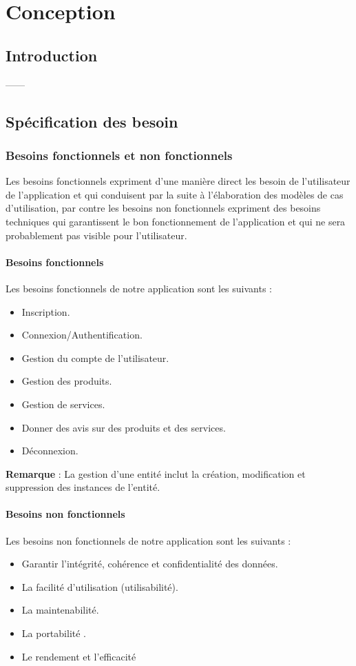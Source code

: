 \chapter{Conception}
\section{Introduction}
------\newline

\section{Spécification des besoin }
\subsection{Besoins fonctionnels et non fonctionnels }
\par Les besoins fonctionnels expriment d’une manière direct les besoin de
l’utilisateur de l’application et qui conduisent par la suite à l'élaboration
des modèles de cas d'utilisation, par contre les besoins non fonctionnels
expriment des besoins techniques qui garantissent le bon fonctionnement de
l'application et qui ne sera probablement pas visible pour l’utilisateur.
\subsubsection{Besoins fonctionnels }
\par Les besoins fonctionnels de notre application sont les suivants :
\begin{itemize}[label=\textbullet] 
\item Inscription.
\item Connexion/Authentification.
\item Gestion du compte de l’utilisateur.
\item Gestion des produits.
\item Gestion de services.
\item Donner des avis sur des produits et des services.
\item Déconnexion.
\end{itemize}
\textbf{Remarque} : La gestion d’une entité inclut la création, modification et
suppression des instances de l'entité.
\subsubsection{Besoins non fonctionnels }
\par Les besoins non fonctionnels de notre application sont les suivants :
\begin{itemize}[label=\textbullet] 
\item Garantir l'intégrité, cohérence et confidentialité des données.
\item La facilité d'utilisation (utilisabilité).
\item La maintenabilité.
\item La portabilité .
\item Le rendement et l’efficacité 
\end{itemize}

